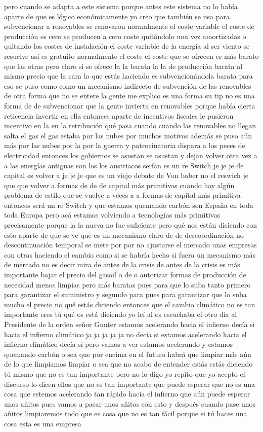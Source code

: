 pero cuando se adapta a este sistema porque antes este sistema no lo había aparte de que es lógico económicamente yo creo que también se usa para subvencionar a renovables se renovaron normalmente el coste variable el coste de producción es cero se producen a cero coste quitándolo una vez amortizadas o quitando los costes de instalación el coste variable de la energía al ser viento se resuelve así es gratuito normalmente el coste el coste que se ofrecen es más barato que las otras pero claro si se ofrece la la barata la la de producción barata al mismo precio que la cara lo que estás haciendo es subvencionándola barata para eso se puso como como un mecanismo indirecto de subvención de las renovables de otra forma que no se entere la gente me explico es una forma su tip no es una forma de de subvencionar que la gente invierta en renovables porque había cierta reticencia invertir en ella entonces aparte de incentivos fiscales le pusieron incentivo en la en la retribución qué pasa cuando cuando las renovables no llegan salta el gas el gas estaba por las nubes por muchos motivos además se puso aún más por las nubes por la por la guerra y patrocinatoria dispara a los peces de electricidad entonces los gobiernos se asustan se asustan y dejan volver otra vez a a las energías antiguas son los los austriacos serían es un re Switch je je je de capital es volver a je je je que es un viejo debate de Von baber no el reswich je que que volver a formas de de de capital más primitivas cuando hay algún problema de estilo que se vuelve a veces a a formas de capital más primitiva entonces será un re Switch y que estamos quemando carbón son España en toda toda Europa pero acá estamos volviendo a tecnologías más primitivas precisamente porque la la nueva no fue suficiente pero qué nos están diciendo con esto aparte de que se ve que es un mecanismo claro de de descoordinación no descontinuación temporal se mete por por no ajustarse el mercado unas empresas con otras haciendo el cambio como si se habría hecho si fuera un mecanismo más de mercado no es decir mira de antes de la crisis de antes de la crisis es más importante bajar el precio del gasoil o de o autorizar formas de producción de necesidad menos limpias pero más baratas pues para que lo suba tanto primero para garantizar el suministro y segundo para pues para garantizar que lo suba mucho el precio no qué estás diciendo entonces que el cambio climático no es tan importante eres tú qué os está diciendo yo leí al os escuchaba el otro día al Presidente de la orden señor Gunter estamos acelerando hacia el infierno decía si hacia el infierno climático ja ja ja ja ja no decía si estamos acelerando hacia el infierno climático decía sí pero vamos a ver estamos acelerando y estamos quemando carbón o sea que por encima en el futuro habrá que limpiar más aún de lo que limpiamos limpiar o sea que no acabo de entender estás estás diciendo tú mismo que no es tan importante pero no lo digo yo repito que yo acepto el discurso lo dicen ellos que no es tan importante que puede esperar que no es una cosa que estemos acelerando tan rápido hacia el infierno que aún puede esperar unos añitos pues vamos a pasar unos añitos con esto y después cuando pase unos añitos limpiaremos todo que es cosa que no es tan fácil porque si tú haces una cosa esta es una empresa 
